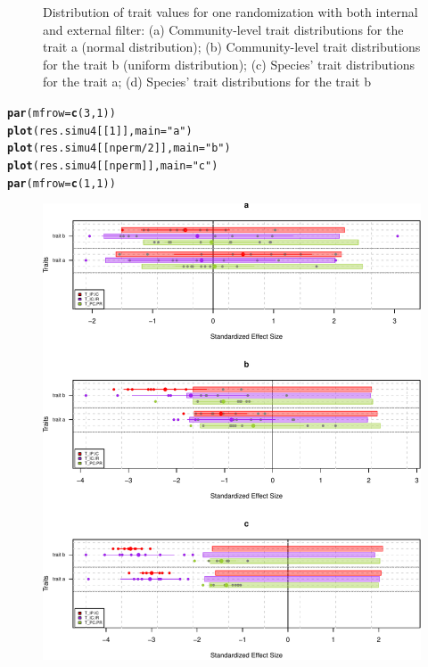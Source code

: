 \documentclass[12pt]{article}\usepackage[]{graphicx}\usepackage[]{color}
\makeatletter
\def\maxwidth{ %
  \ifdim\Gin@nat@width>\linewidth
    \linewidth
  \else
    \Gin@nat@width
  \fi
}
\newcommand{\hlnum}[1]{\textcolor[rgb]{0.686,0.059,0.569}{#1}}%
\newcommand{\hlstr}[1]{\textcolor[rgb]{0.192,0.494,0.8}{#1}}%
\newcommand{\hlopt}[1]{\textcolor[rgb]{0,0,0}{#1}}%
\newcommand{\hlstd}[1]{\textcolor[rgb]{0.345,0.345,0.345}{#1}}%
\newcommand{\hlkwc}[1]{\textcolor[rgb]{0.333,0.667,0.333}{#1}}%
\newcommand{\hlkwd}[1]{\textcolor[rgb]{0.737,0.353,0.396}{\textbf{#1}}}%
\newenvironment{kframe}{%
 \def\at@end@of@kframe{}%
 \ifinner\ifhmode%
  \def\at@end@of@kframe{\end{minipage}}%
  \begin{minipage}{\columnwidth}%
 \fi\fi%
 \def\FrameCommand##1{\hskip\@totalleftmargin \hskip-\fboxsep
 \colorbox{shadecolor}{##1}\hskip-\fboxsep
     \hskip-\linewidth \hskip-\@totalleftmargin \hskip\columnwidth}%
 \MakeFramed {\advance\hsize-\width
   \@totalleftmargin\z@ \linewidth\hsize
   \@setminipage}}%
 {\par\unskip\endMakeFramed%
 \at@end@of@kframe}
\newenvironment{knitrout}{}{} %
\makeatother
\begin{document}
\begin{knitrout}
\begin{figure}
{}

\caption[Distribution of trait values for one randomization with both internal and external filter]{Distribution of trait values for one randomization with both internal and external filter: (a) Community-level trait distributions for the trait a (normal distribution); (b) Community-level trait distributions for the trait b (uniform distribution); (c) Species' trait distributions for the trait a; (d) Species' trait distributions for the trait b}\label{fig:InEx_Filter_plots}
\end{figure}


\end{knitrout}

\begin{knitrout}\small
{}\color{fgcolor}\begin{kframe}
\begin{alltt}
\hlkwd{par}\hlstd{(}\hlkwc{mfrow}\hlstd{=}\hlkwd{c}\hlstd{(}\hlnum{3}\hlstd{,} \hlnum{1}\hlstd{))}
\hlkwd{plot}\hlstd{(res.simu4[[}\hlnum{1}\hlstd{]],} \hlkwc{main} \hlstd{=} \hlstr{"a"}\hlstd{)}
\hlkwd{plot}\hlstd{(res.simu4[[nperm}\hlopt{/}\hlnum{2}\hlstd{]],} \hlkwc{main} \hlstd{=} \hlstr{"b"}\hlstd{)}
\hlkwd{plot}\hlstd{(res.simu4[[nperm]],} \hlkwc{main} \hlstd{=} \hlstr{"c"}\hlstd{)}
\hlkwd{par}\hlstd{(}\hlkwc{mfrow}\hlstd{=}\hlkwd{c}\hlstd{(}\hlnum{1}\hlstd{,} \hlnum{1}\hlstd{))}
\end{alltt}
\end{kframe}\begin{figure}

{\centering \includegraphics[width=\maxwidth]{figure/InEx_Filter_plots_Tstats-1} 

}
\end{figure}
\end{knitrout}
\end{document}

